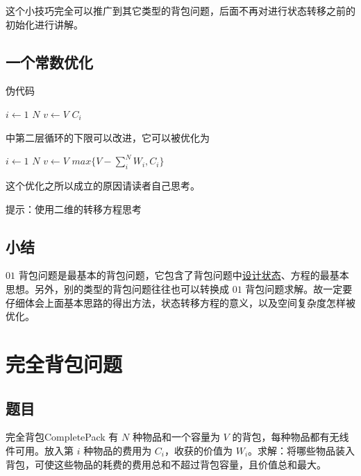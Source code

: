 \documentclass[cn, 11pt, chinese, toc=twocol]{elegantbook}
\begin{document}
\begin{note}
这个小技巧完全可以推广到其它类型的背包问题，后面不再对进行状态转移之前的 初始化进行讲解。
\end{note}

\section{一个常数优化}

伪代码
\begin{codebox}
  \li \For $i \gets 1$ \To $N$
        \Do
  \li \For $v \gets V$ \To $C_i$
        \End
\end{codebox}

中第二层循环的下限可以改进，它可以被优化为

\begin{codebox}
  \li \For $i \gets 1$ \To $N$
        \Do
  \li \For $v \gets V$ \To $max\{ V - \sum_{i}^{N} W_i, C_i \}$
        \End
\end{codebox}

这个优化之所以成立的原因请读者自己思考。

\begin{remark}
提示：使用二维的转移方程思考
\end{remark}

\section{小结}

$01$ 背包问题是最基本的背包问题，它包含了背包问题中\underline{设计状态}、方程的最基本思想。另外，别的类型的背包问题往往也可以转换成 $01$ 背包问题求解。故一定要仔细体会上面基本思路的得出方法，状态转移方程的意义，以及空间复杂度怎样被优化。

\chapter{完全背包问题}

\section{题目}

\begin{definition}{完全背包}{CompletePack}
有 $N$ 种物品和一个容量为 $V$ 的背包，每种物品都有无线件可用。放入第 $i$ 种物品的费用为 $C_i$，收获的价值为 $W_i$。求解：将哪些物品装入背包，可使这些物品的耗费的费用总和不超过背包容量，且价值总和最大。
\end{definition}
\end{document}
